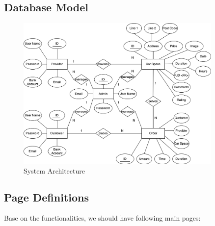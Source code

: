 \documentclass[12pt]{article}
\begin{document}
  \subsection{Database Model}
  \begin{figure}[htp]
    \centering
  \includegraphics[width=0.9\textwidth]{UI Design-ER.drawio.png}
  
  \caption{System Architecture}
  \end{figure}
  \subsection{Page Definitions}
  
  Base on the functionalities, we should have following main pages:
\end{document}
